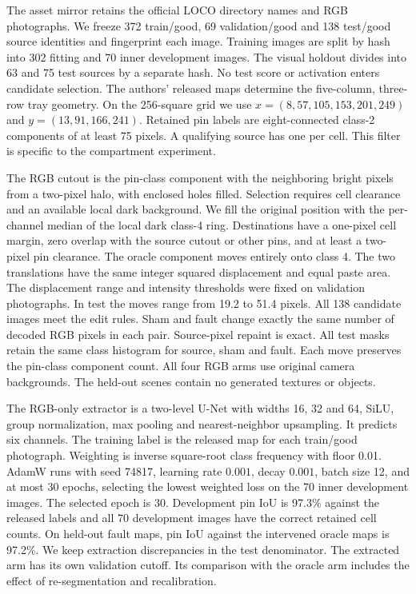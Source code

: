\label{sec:supp_edits}
The asset mirror retains the official LOCO directory names and RGB photographs. We freeze 372 train/good, 69 validation/good and 138 test/good source identities and fingerprint each image. Training images are split by hash into 302 fitting and 70 inner development images. The visual holdout divides into 63 and 75 test sources by a separate hash. No test score or activation enters candidate selection. The authors' released maps determine the five-column, three-row tray geometry. On the 256-square grid we use $x=(8,57,105,153,201,249)$ and $y=(13,91,166,241)$. Retained pin labels are eight-connected class-2 components of at least 75 pixels. A qualifying source has one per cell. This filter is specific to the compartment experiment.

The RGB cutout is the pin-class component with the neighboring bright pixels from a two-pixel halo, with enclosed holes filled. Selection requires cell clearance and an available local dark background. We fill the original position with the per-channel median of the local dark class-4 ring. Destinations have a one-pixel cell margin, zero overlap with the source cutout or other pins, and at least a two-pixel pin clearance. The oracle component moves entirely onto class 4. The two translations have the same integer squared displacement and equal paste area. The displacement range and intensity thresholds were fixed on validation photographs. In test the moves range from 19.2 to 51.4 pixels. All 138 candidate images meet the edit rules. Sham and fault change exactly the same number of decoded RGB pixels in each pair. Source-pixel repaint is exact. All test masks retain the same class histogram for source, sham and fault. Each move preserves the pin-class component count. All four RGB arms use original camera backgrounds. The held-out scenes contain no generated textures or objects.

The RGB-only extractor is a two-level U-Net with widths 16, 32 and 64, SiLU, group normalization, max pooling and nearest-neighbor upsampling. It predicts six channels. The training label is the released map for each train/good photograph. Weighting is inverse square-root class frequency with floor 0.01. AdamW runs with seed 74817, learning rate $0.001$, decay $0.001$, batch size 12, and at most 30 epochs, selecting the lowest weighted loss on the 70 inner development images. The selected epoch is 30. Development pin IoU is 97.3\% against the released labels and all 70 development images have the correct retained cell counts. On held-out fault maps, pin IoU against the intervened oracle maps is 97.2\%. We keep extraction discrepancies in the test denominator. The extracted arm has its own validation cutoff. Its comparison with the oracle arm includes the effect of re-segmentation and recalibration.


